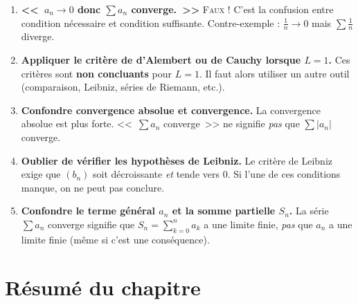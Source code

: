 \documentclass[12pt,a4paper,openany]{book}
\theoremstyle{definition}
\newcommand{\abs}[1]{\left\lvert #1 \right\rvert}
\begin{document}
\begin{enumerate}[label=\textbf{E\arabic*.}, leftmargin=2cm]
  \item \textbf{<<~$a_n \to 0$ donc $\sum a_n$ converge.~>>}
    \textsc{Faux !} C'est la confusion entre condition nécessaire et condition suffisante.
    Contre-exemple : $\frac{1}{n} \to 0$ mais $\sum \frac{1}{n}$ diverge.

  \item \textbf{Appliquer le critère de d'Alembert ou de Cauchy lorsque $L = 1$.}
    Ces critères sont \textbf{non concluants} pour $L = 1$. Il faut alors utiliser un
    autre outil (comparaison, Leibniz, séries de Riemann, etc.).

  \item \textbf{Confondre convergence absolue et convergence.}
    La convergence absolue est plus forte. <<~$\sum a_n$ converge~>> ne signifie
    \emph{pas} que $\sum \abs{a_n}$ converge.

  \item \textbf{Oublier de vérifier les hypothèses de Leibniz.}
    Le critère de Leibniz exige que $(b_n)$ soit décroissante \emph{et} tende vers $0$.
    Si l'une de ces conditions manque, on ne peut pas conclure.

  \item \textbf{Confondre le terme général $a_n$ et la somme partielle $S_n$.}
    La série $\sum a_n$ converge signifie que $S_n = \sum_{k=0}^n a_k$ a une limite
    finie, \emph{pas} que $a_n$ a une limite finie (même si c'est une conséquence).
\end{enumerate}

\section{Résumé du chapitre}\label{sec:series:resume}
\end{document}
